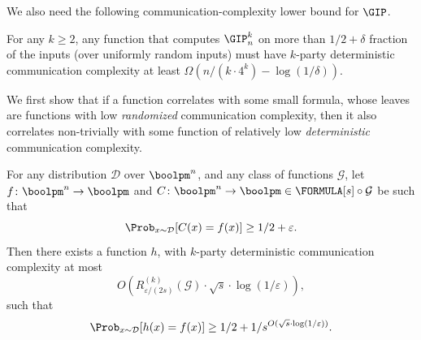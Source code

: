     We also need the following communication-complexity lower bound for $\GIP$.
    
    \begin{theorem}\label{thm:lb-GIP-bound}
        For any $k\geq 2$, any function that computes $\GIP_{n}^{k}$ on more than $1/2+\delta$ fraction of the inputs (over uniformly random inputs) must have $k$-party deterministic communication complexity at least $\Omega \! \left(n/(k \cdot 4^k) - \log(1/\delta)\right)$.
    \end{theorem}
    
    We first show that if a function correlates with some small formula, whose leaves are functions with low \emph{randomized} communication complexity, then it also correlates non-trivially with some function of relatively low \emph{deterministic} communication complexity.
    
    \begin{lemma}\label{thm:lb-proof-1}
        For any distribution $\mathcal{D}$ over $\boolpm^n$, and any class of functions $\mathcal{G}$, let $f\colon\boolpm^n\to\boolpm$ and $C\colon\boolpm^n\to\boolpm\in \FORMULA[s]\circ\mathcal{G}$ be such that 
	    \[
	        \Prob_{x\sim\mathcal{D}}[C(x)=f(x)]\geq 1/2+\varepsilon.
	    \]
	    Then there exists a function $h$, with $k$-party deterministic communication complexity at most
	    \[
	        O\left(R^{(k)}_{\varepsilon/(2s)}(\mathcal{G})\cdot\sqrt{s}\cdot\log(1/\varepsilon)\right),
	    \]
	    such that
	    \[
	        \Prob_{x\sim\mathcal{D}}[h(x)=f(x)]\geq 1/2+1/s^{O(\sqrt{s}\cdot\log(1/\varepsilon))}.
	    \]
    \end{lemma}
    
